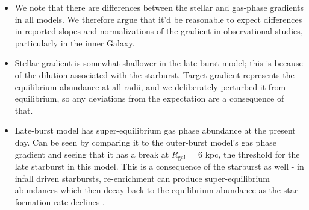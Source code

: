 \documentclass[fleqn, usenatbib]{mnras}
\begin{document}
\begin{itemize}
	\item We note that there are differences between the stellar and gas-phase 
	gradients in all models. We therefore argue that it'd be reasonable to 
	expect differences in reported slopes and normalizations of the gradient 
	in observational studies, particularly in the inner Galaxy. 

	\item Stellar gradient is somewhat shallower in the late-burst model; this 
	is because of the dilution associated with the starburst. Target gradient 
	represents the equilibrium abundance at all radii, and we deliberately 
	perturbed it from equilibrium, so any deviations from the expectation are 
	a consequence of that. 

	\item Late-burst model has super-equilibrium gas phase abundance at the 
	present day. Can be seen by comparing it to the outer-burst model's 
	gas phase gradient and seeing that it has a break at $R_\text{gal}$ = 6 
	kpc, the threshold for the late starburst in this model. This is a 
	consequence of the starburst as well - in infall driven starbursts, 
	re-enrichment can produce super-equilibrium abundances which then decay 
	back to the equilibrium abundance as the star formation rate declines 
	\citep{Johnson2020}. 
\end{itemize} 





\end{document}
